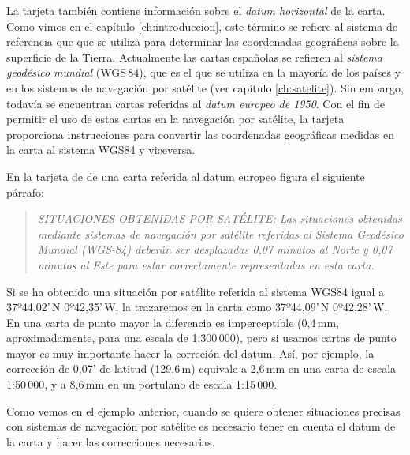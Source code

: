 La tarjeta también contiene información sobre el \emph{datum horizontal} de la carta. Como 
vimos en el capítulo \ref{ch:introduccion}, este término se refiere al sistema de referencia que 
que se utiliza para determinar las coordenadas geográficas sobre la superficie de la Tierra. 
Actualmente las cartas españolas se refieren al \emph{sistema geodésico mundial} (WGS\,84), 
que es el que se utiliza en la mayoría de los países y 
en los sistemas de navegación por satélite  (ver capítulo \ref{ch:satelite}). Sin embargo, todavía se encuentran cartas referidas al  \emph{datum europeo de 1950}. Con el fin de permitir el uso de estas cartas en la navegación por satélite, la tarjeta proporciona instrucciones para convertir las coordenadas geográficas medidas en la carta al sistema WGS84 y 
viceversa. 


\begin{ejemplo}
En la tarjeta de de una carta referida al datum europeo %
figura el siguiente párrafo: 
\begin{quotation}\noindent\itshape
SITUACIONES OBTENIDAS POR SATÉLITE: Las situaciones obtenidas mediante sistemas 
de navegación por satélite referidas al Sistema Geodésico Mundial (WGS-84) deberán ser 
desplazadas 0,07 minutos al Norte y 0,07 minutos al Este para estar correctamente representadas en esta carta. 
\end{quotation}
Si se ha obtenido una situación por satélite referida al sistema WGS84 igual a 37º44,02’\,N
0º42,35’\,W, la trazaremos en la carta como 37º44,09’\,N 0º42,28’\,W. En una carta de punto mayor
la diferencia es imperceptible (0,4\,mm, aproximadamente, para una escala de 1:300\,000), pero si usamos cartas de 
punto mayor es muy importante hacer la correción del datum. Así, por ejemplo, la corrección de 0,07’ 
de latitud (129,6\,m) equivale a 2,6\,mm en una carta de escala 1:50\,000, y a 8,6\,mm en un portulano de escala
 1:15\,000.
\end{ejemplo}

Como vemos en el ejemplo anterior, cuando se quiere obtener situaciones precisas con 
sistemas de navegación por satélite es necesario tener en cuenta el datum de la carta y 
hacer las correcciones necesarias. 

